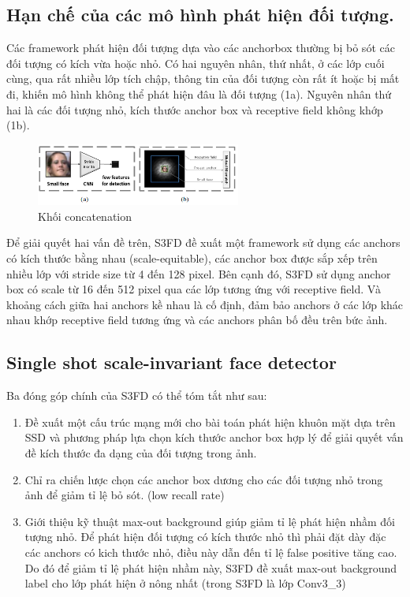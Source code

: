 \documentclass[a4paper]{report}
\begin{document}
\subsection {Hạn chế của các mô hình phát hiện đối tượng. }
Các framework phát hiện đối tượng dựa vào các anchorbox thường bị bỏ sót các đối tượng có kích vừa hoặc nhỏ. Có hai nguyên nhân, thứ nhất, ở các lớp cuối cùng, qua rất nhiều lớp tích chập, thông tin của đối tượng còn rất ít hoặc bị mất đi, khiến mô hình không thể phát hiện đâu là đối tượng (1a). Nguyên nhân thứ hai là các đối tượng nhỏ, kích thước anchor box và receptive field không khớp (1b).
\\
\begin{figure}[h!]
	\centering
	\includegraphics[width=0.6\textwidth]{3_erf.png}
	\caption[Caption for LOF]{Khối concatenation}
\end{figure}

Để giải quyết hai vấn đề trên, S3FD đề xuất một framework sử dụng các anchors có kích thước bằng nhau (scale-equitable), các anchor box được sắp xếp trên nhiều lớp với stride size từ 4 đến 128 pixel. Bên cạnh đó, S3FD sử dụng anchor box có scale từ 16 đến 512 pixel qua các lớp tương ứng với receptive field. Và khoảng cách giữa hai anchors kề nhau là cố định, đảm bảo anchors ở các lớp khác nhau khớp receptive field tương ứng và các anchors phân bố đều trên bức ảnh. 
\\

\subsection {Single shot scale-invariant face detector}
Ba đóng góp chính của S3FD có thể tóm tắt như sau:
\begin{enumerate}
\item Đề xuất một cấu trúc mạng mới cho bài toán phát hiện khuôn mặt dựa trên SSD và phương pháp lựa chọn kích thước anchor box hợp lý để giải quyết vấn đề kích thước đa dạng của đối tượng trong ảnh.
\item Chỉ ra chiến lược chọn các anchor box dương cho các đối tượng nhỏ trong ảnh để giảm tỉ lệ bỏ sót. (low recall rate) 
\item Giới thiệu kỹ thuật max-out background giúp giảm tỉ lệ phát hiện nhầm đối tượng nhỏ. 
Để phát hiện đối tượng có kích thước nhỏ thì phải đặt dày đặc các anchors có kich thước nhỏ, điều này dẫn đến tỉ lệ false positive tăng cao. Do đó để giảm tỉ lệ phát hiện nhầm này, S3FD đề xuất max-out background label cho lớp phát hiện ở nông nhất (trong S3FD là lớp Conv3\_3) 
\end{enumerate}
\end{document}
